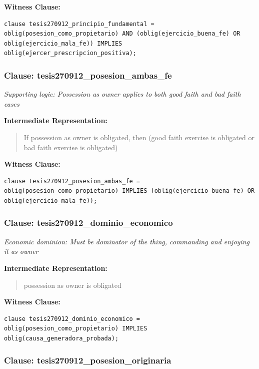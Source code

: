\documentclass[11pt,a4paper]{article}
\begin{document}
\textbf{Witness Clause:}

\begin{lstlisting}[style=witnessstyle, language=Witness]
clause tesis270912_principio_fundamental = oblig(posesion_como_propietario) AND (oblig(ejercicio_buena_fe) OR oblig(ejercicio_mala_fe)) IMPLIES oblig(ejercer_prescripcion_positiva);
\end{lstlisting}

\subsubsection{Clause: tesis270912\_posesion\_ambas\_fe}

\textit{Supporting logic: Possession as owner applies to both good faith and bad faith cases}

\textbf{Intermediate Representation:}

\begin{quote}
If possession as owner is obligated, then (good faith exercise is obligated or bad faith exercise is obligated)
\end{quote}

\textbf{Witness Clause:}

\begin{lstlisting}[style=witnessstyle, language=Witness]
clause tesis270912_posesion_ambas_fe = oblig(posesion_como_propietario) IMPLIES (oblig(ejercicio_buena_fe) OR oblig(ejercicio_mala_fe));
\end{lstlisting}

\subsubsection{Clause: tesis270912\_dominio\_economico}

\textit{Economic dominion: Must be dominator of the thing, commanding and enjoying it as owner}

\textbf{Intermediate Representation:}

\begin{quote}
possession as owner is obligated
\end{quote}

\textbf{Witness Clause:}

\begin{lstlisting}[style=witnessstyle, language=Witness]
clause tesis270912_dominio_economico = oblig(posesion_como_propietario) IMPLIES oblig(causa_generadora_probada);
\end{lstlisting}

\subsubsection{Clause: tesis270912\_posesion\_originaria}
\end{document}
